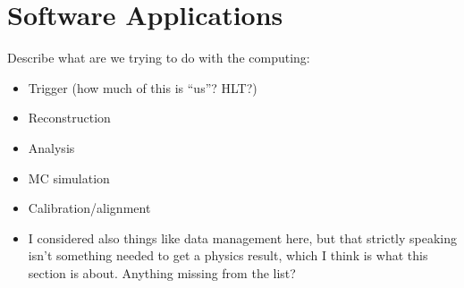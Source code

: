 \documentclass [draft,notitlepage] {article}
\begin{document}
\section{Software Applications} 
Describe what are we trying to do with the computing:
\begin{itemize}

\item Trigger (how much of this is ``us''?  HLT?)


\item Reconstruction

\item Analysis

\item MC simulation

\item Calibration/alignment

\item I considered also things like data management here, but that strictly speaking isn't something needed to get a physics result, which I think is what this section is about.  Anything missing from the list?
\end{itemize}
\end{document}
